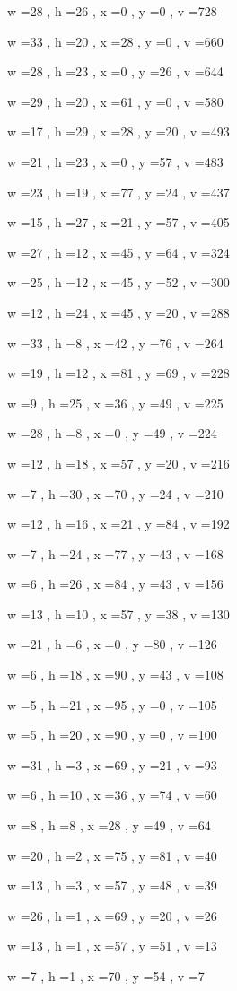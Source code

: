\documentclass[11pt]{article}
\begin{document}
w =28 , h =26 , x =0 , y =0 , v =728
\par
w =33 , h =20 , x =28 , y =0 , v =660
\par
w =28 , h =23 , x =0 , y =26 , v =644
\par
w =29 , h =20 , x =61 , y =0 , v =580
\par
w =17 , h =29 , x =28 , y =20 , v =493
\par
w =21 , h =23 , x =0 , y =57 , v =483
\par
w =23 , h =19 , x =77 , y =24 , v =437
\par
w =15 , h =27 , x =21 , y =57 , v =405
\par
w =27 , h =12 , x =45 , y =64 , v =324
\par
w =25 , h =12 , x =45 , y =52 , v =300
\par
w =12 , h =24 , x =45 , y =20 , v =288
\par
w =33 , h =8 , x =42 , y =76 , v =264
\par
w =19 , h =12 , x =81 , y =69 , v =228
\par
w =9 , h =25 , x =36 , y =49 , v =225
\par
w =28 , h =8 , x =0 , y =49 , v =224
\par
w =12 , h =18 , x =57 , y =20 , v =216
\par
w =7 , h =30 , x =70 , y =24 , v =210
\par
w =12 , h =16 , x =21 , y =84 , v =192
\par
w =7 , h =24 , x =77 , y =43 , v =168
\par
w =6 , h =26 , x =84 , y =43 , v =156
\par
w =13 , h =10 , x =57 , y =38 , v =130
\par
w =21 , h =6 , x =0 , y =80 , v =126
\par
w =6 , h =18 , x =90 , y =43 , v =108
\par
w =5 , h =21 , x =95 , y =0 , v =105
\par
w =5 , h =20 , x =90 , y =0 , v =100
\par
w =31 , h =3 , x =69 , y =21 , v =93
\par
w =6 , h =10 , x =36 , y =74 , v =60
\par
w =8 , h =8 , x =28 , y =49 , v =64
\par
w =20 , h =2 , x =75 , y =81 , v =40
\par
w =13 , h =3 , x =57 , y =48 , v =39
\par
w =26 , h =1 , x =69 , y =20 , v =26
\par
w =13 , h =1 , x =57 , y =51 , v =13
\par
w =7 , h =1 , x =70 , y =54 , v =7
\par
\newpage
\end{document}

